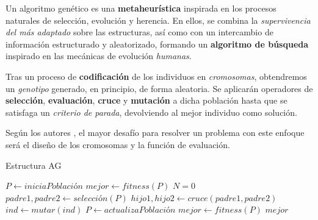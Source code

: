 Un algoritmo genético es una \textbf{metaheurística} inspirada en los procesos naturales de selección, evolución y herencia. En ellos, se combina la \textit{supervivencia del más adaptado} sobre las estructuras, así como con un intercambio de información estructurado y aleatorizado, formando un \textbf{algoritmo de búsqueda} inspirado en las mecánicas de evolución \textit{humanas}.  \cite{Goldberg1989GeneticLearning}


Tras un proceso de \textbf{codificación} de los individuos en \textit{cromosomas}, obtendremos un \textit{genotipo} generado, en principio, de forma aleatoria. Se aplicarán operadores de \textbf{selección}, \textbf{evaluación}, \textbf{cruce} y \textbf{mutación} a dicha población hasta que se satisfaga un \textit{criterio de parada}, devolviendo al mejor individuo como solución.

Según los autores \cite{Lin2020AScheduling}\cite{Goldberg1989GeneticLearning}, el mayor desafío para resolver un problema con este enfoque será el diseño de los cromosomas y la función de evaluación.

\begin{algorithm}
\caption{Estructura AG}\label{alg:ag}
\begin{algorithmic}
\State $P \gets iniciaPoblación$
\State $mejor \gets fitness(P)$
\State $N = 0$
\State $padre1,padre2 \gets selección(P)$
\State $hijo1,hijo2 \gets cruce(padre1,padre2)$
\EndIf
{}
\State $ind \gets mutar(ind)$
\EndIf
\State $P \gets actualizaPoblación$
\State $mejor \gets fitness(P)$
\EndWhile
\State \Return $mejor$
\end{algorithmic}
\end{algorithm}

